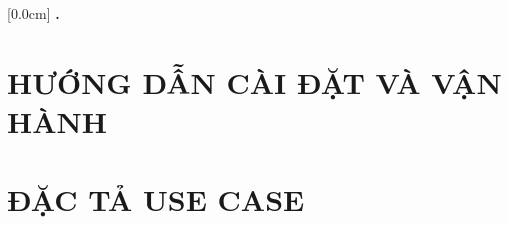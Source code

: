 \documentclass[a4paper,13pt,3p,twoside]{report}
\theoremstyle{definition}
\begin{document}
    [0.0cm]             %
    {\bfseries\vspace{0.3cm}}                  %
    {{\bfseries{\scshape} \thecontentslabel.\ }} %
    {}         %
    {\contentspage}         %
\chapter{HƯỚNG DẪN CÀI ĐẶT VÀ VẬN HÀNH}

\newpage
\chapter{ĐẶC TẢ USE CASE}

\end{document}
